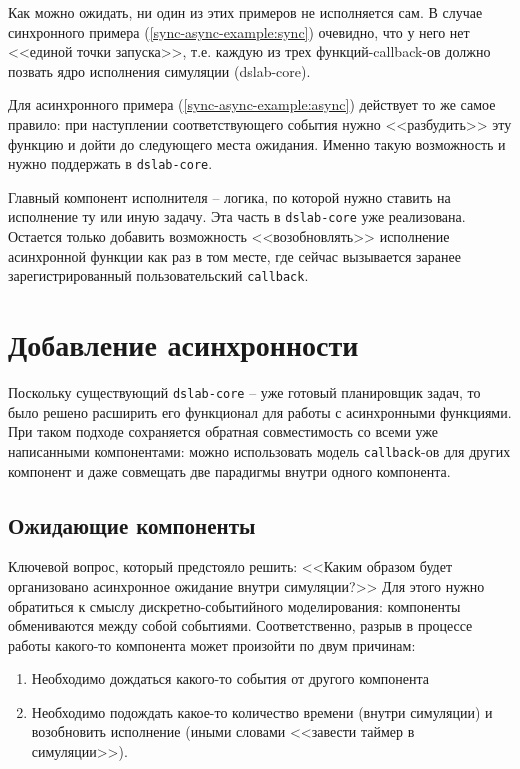 Как можно ожидать, ни один из этих примеров не исполняется сам. В случае синхронного примера (\ref{sync-async-example:sync}) очевидно, что у него нет <<единой точки запуска>>, т.е. каждую из трех функций-callback-ов должно позвать ядро исполнения симуляции (dslab-core). 

Для асинхронного примера (\ref{sync-async-example:async}) действует то же самое правило: при наступлении соответствующего события нужно <<разбудить>> эту функцию и дойти до следующего места ожидания. Именно такую возможность и нужно поддержать в \texttt{dslab-core}. 

Главный компонент исполнителя -- логика, по которой нужно ставить на исполнение ту или иную задачу. Эта часть в \texttt{dslab-core} уже реализована. Остается только добавить возможность <<возобновлять>> исполнение асинхронной функции как раз в том месте, где сейчас вызывается заранее зарегистрированный пользовательский \texttt{callback}.


\section{Добавление асинхронности}

Поскольку существующий \texttt{dslab-core} -- уже готовый планировщик задач, то было решено расширить его функционал для работы с асинхронными функциями. При таком подходе сохраняется обратная совместимость со всеми уже написанными компонентами: можно использовать модель \texttt{callback}-ов для других компонент и даже совмещать две парадигмы внутри одного компонента. 

\subsection{Ожидающие компоненты}

Ключевой вопрос, который предстояло решить: <<Каким образом будет организовано асинхронное ожидание внутри симуляции?>> Для этого нужно обратиться к смыслу дискретно-событийного моделирования: компоненты обмениваются между собой событиями. Соответственно, разрыв в процессе работы какого-то компонента может произойти по двум причинам:
\begin{enumerate}
    \item Необходимо дождаться какого-то события от другого компонента 
    \item Необходимо подождать какое-то количество времени (внутри симуляции) и возобновить исполнение (иными словами <<завести таймер в симуляции>>).
\end{enumerate}

